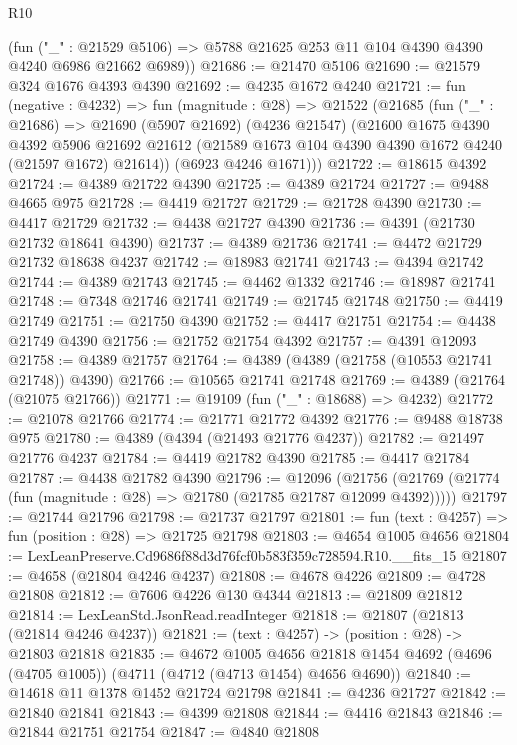 \begin{lexlean}{R10}
\begin{coremodule}
      (fun ("_" : @21529 @5106) => @5788 @21625 @253 @11 @104 @4390 @4390 @4240 @6986 @21662 @6989))
@21686 := @21470 @5106
@21690 := @21579 @324 @1676 @4393 @4390
@21692 := @4235 @1672 @4240
@21721 := fun (negative : @4232) =>
  fun (magnitude : @28) =>
  @21522
    (@21685
      (fun ("_" : @21686) =>
      @21690
        (@5907 @21692)
        (@4236 @21547)
        (@21600
          @1675
          @4390
          @4392
          @5906
          @21692
          @21612
          (@21589 @1673 @104 @4390 @4390 @1672 @4240 (@21597 @1672) @21614))
        (@6923 @4246 @1671)))
@21722 := @18615 @4392
@21724 := @4389 @21722 @4390
@21725 := @4389 @21724
@21727 := @9488 @4665 @975
@21728 := @4419 @21727
@21729 := @21728 @4390
@21730 := @4417 @21729
@21732 := @4438 @21727 @4390
@21736 := @4391 (@21730 @21732 @18641 @4390)
@21737 := @4389 @21736
@21741 := @4472 @21729 @21732 @18638 @4237
@21742 := @18983 @21741
@21743 := @4394 @21742
@21744 := @4389 @21743
@21745 := @4462 @1332
@21746 := @18987 @21741
@21748 := @7348 @21746 @21741
@21749 := @21745 @21748
@21750 := @4419 @21749
@21751 := @21750 @4390
@21752 := @4417 @21751
@21754 := @4438 @21749 @4390
@21756 := @21752 @21754 @4392
@21757 := @4391 @12093
@21758 := @4389 @21757
@21764 := @4389 (@4389 (@21758 (@10553 @21741 @21748)) @4390)
@21766 := @10565 @21741 @21748
@21769 := @4389 (@21764 (@21075 @21766))
@21771 := @19109 (fun ("_" : @18688) => @4232)
@21772 := @21078 @21766
@21774 := @21771 @21772 @4392
@21776 := @9488 @18738 @975
@21780 := @4389 (@4394 (@21493 @21776 @4237))
@21782 := @21497 @21776 @4237
@21784 := @4419 @21782 @4390
@21785 := @4417 @21784
@21787 := @4438 @21782 @4390
@21796 := @12096
    (@21756 (@21769 (@21774 (fun (magnitude : @28) => @21780 (@21785 @21787 @12099 @4392)))))
@21797 := @21744 @21796
@21798 := @21737 @21797
@21801 := fun (text : @4257) => fun (position : @28) => @21725 @21798
@21803 := @4654 @1005 @4656
@21804 := LexLeanPreserve.Cd9686f88d3d76fcf0b583f359c728594.R10.__fits_15
@21807 := @4658 (@21804 @4246 @4237)
@21808 := @4678 @4226
@21809 := @4728 @21808
@21812 := @7606 @4226 @130 @4344
@21813 := @21809 @21812
@21814 := LexLeanStd.JsonRead.readInteger
@21818 := @21807 (@21813 (@21814 @4246 @4237))
@21821 := (text : @4257) -> (position : @28) -> @21803 @21818
@21835 := @4672
    @1005
    @4656
    @21818
    @1454
    @4692
    (@4696 (@4705 @1005))
    (@4711 (@4712 (@4713 @1454) @4656 @4690))
@21840 := @14618 @11 @1378 @1452 @21724 @21798
@21841 := @4236 @21727
@21842 := @21840 @21841
@21843 := @4399 @21808
@21844 := @4416 @21843
@21846 := @21844 @21751 @21754
@21847 := @4840 @21808

\end{coremodule}
\end{lexlean}
